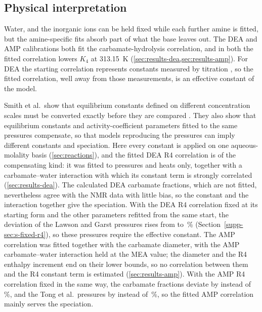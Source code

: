 

\subsection{Physical interpretation}\label{sec:discussion-interpretation}
Water, \COtwo and the inorganic ions can be held fixed while each further amine is fitted, but the amine-specific fits absorb part of what the base leaves out.
The DEA and AMP calibrations both fit the carbamate-hydrolysis correlation, and in both the fitted correlation lowers $K_4$ at \SI{313.15}{\kelvin} (\cref{sec:results-dea,sec:results-amp}).
For DEA the starting correlation represents constants measured by titration \cite{arouaTemperatureDependencyEquilibrium1997}, so the fitted correlation, well away from those measurements, is an effective constant of the model.

Smith et al.\ show that equilibrium constants defined on different concentration scales must be converted exactly before they are compared \cite{smithGibbsEnergyMinimization}.
They also show that equilibrium constants and activity-coefficient parameters fitted to the same \COtwo pressures compensate, so that models reproducing the pressures can imply different constants and speciation.
Here every constant is applied on one aqueous-molality basis (\cref{sec:reactions}), and the fitted DEA R4 correlation is of the compensating kind: it was fitted to pressures and heats only, together with a carbamate--water interaction with which its constant term is strongly correlated (\cref{sec:results-dea}).
The calculated DEA carbamate fractions, which are not fitted, nevertheless agree with the NMR data with little bias, so the constant and the interaction together give the speciation.
With the DEA R4 correlation fixed at its starting form and the other parameters refitted from the same start, the deviation of the Lawson and Garst pressures rises from  to \,\% (Section~\ref{supp-sec:s-fixed-r4}), so these pressures require the effective constant.
The AMP correlation was fitted together with the carbamate diameter, with the AMP carbamate--water interaction held at the MEA value; the diameter and the R4 enthalpy increment end on their lower bounds, so no correlation between them and the R4 constant term is estimated (\cref{sec:results-amp}).
With the AMP R4 correlation fixed in the same way, the carbamate fractions deviate by  instead of \,\%, and the Tong et al.\ pressures by  instead of \,\%, so the fitted AMP correlation mainly serves the speciation.

